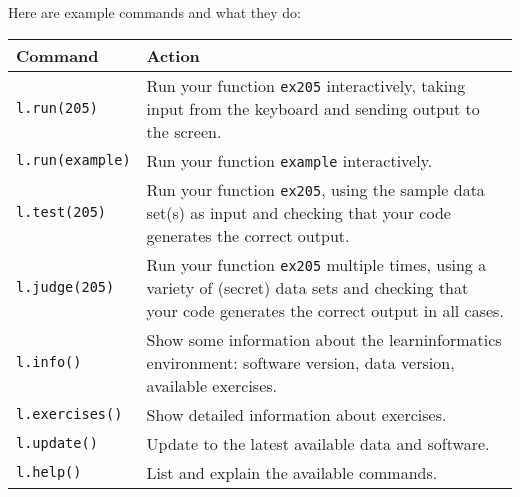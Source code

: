 Here are example commands and what they do:
\begin{center}
  \begin{tabular}{lp{12cm}}
    \toprule
    \textbf{Command}        & \textbf{Action} \\
    \midrule
    \texttt{l.run(205)}     & Run your function \texttt{ex205} interactively, taking
                              input from the keyboard and sending output to the
                              screen.\\[2pt]
    \texttt{l.run(example)} & Run your function \texttt{example} interactively.\\[2pt]
    \texttt{l.test(205)}    & Run your function \texttt{ex205}, using the sample data
                              set(s) as input and checking that your code generates
                              the correct output.\\[2pt]
    \texttt{l.judge(205)}   & Run your function \texttt{ex205} multiple times, using a
                              variety of (secret) data sets and checking that your code
                              generates the correct output in all cases.\\[2pt]
    \midrule
    \texttt{l.info()}       & Show some information about the learninformatics
                              environment: software version, data version, available
                              exercises.\\[2pt]
    \texttt{l.exercises()}  & Show detailed information about exercises.\\[2pt]
    \texttt{l.update()}     & Update to the latest available data and software.\\[2pt]
    \midrule
    \texttt{l.help()}       & List and explain the available commands.\\
    \bottomrule
  \end{tabular}
\end{center}
